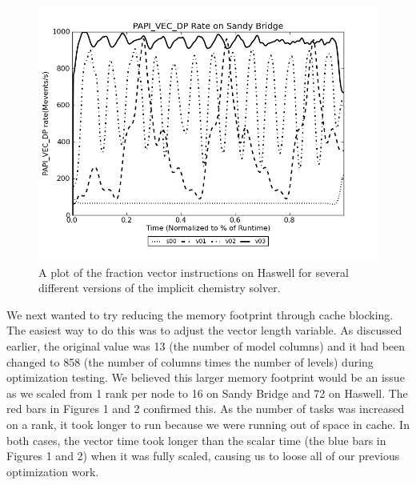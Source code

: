 \begin{figure}[tbp]
 \begin{center}
\includegraphics[width=12.0cm]{figures/PAPI_VEC_DP.png}
\end{center}
\caption{A plot of the fraction vector instructions on Haswell for several different versions of the implicit chemistry solver. }
\label{fig:chem-vec-dp}
\end{figure}

We next wanted to try reducing the memory footprint through cache blocking.  The easiest way to do this was to adjust the vector length variable.  As discussed earlier, the original value was 13 (the number of model columns) and it had been changed to 858 (the number of columns times the number of levels) during optimization testing.  We believed this larger memory footprint would be an issue as we scaled from 1 rank per node to 16 on Sandy Bridge and 72 on Haswell.  The red bars in Figures 1 and 2 confirmed this.  As the number of tasks was increased on a rank, it took longer to run because we were running out of space in cache.  In both cases, the vector time took longer than the scalar time (the blue bars in Figures 1 and 2) when it was fully scaled, causing us to loose all of our previous optimization work.  

